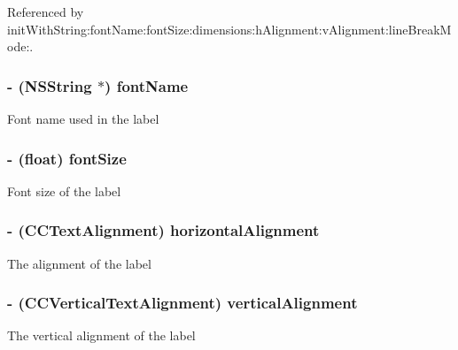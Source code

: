 Referenced by init\-With\-String\-:font\-Name\-:font\-Size\-:dimensions\-:h\-Alignment\-:v\-Alignment\-:line\-Break\-Mode\-:.

\hypertarget{class_c_c_label_t_t_f_a199068e8677eb501ce9c4b450c6bd6d5}{
\subsubsection[{font\-Name}]{\setlength{\rightskip}{0pt plus 5cm}-\/ (N\-S\-String $\ast$) {\bf font\-Name}}}\label{class_c_c_label_t_t_f_a199068e8677eb501ce9c4b450c6bd6d5}
Font name used in the label \hypertarget{class_c_c_label_t_t_f_a1a0e51fec83aae88bb9442d5daf94ceb}{
\subsubsection[{font\-Size}]{\setlength{\rightskip}{0pt plus 5cm}-\/ (float) {\bf font\-Size}}}\label{class_c_c_label_t_t_f_a1a0e51fec83aae88bb9442d5daf94ceb}
Font size of the label \hypertarget{class_c_c_label_t_t_f_a16597bc8f8ede72cadbaf9c3d1aef4f9}{
\subsubsection[{horizontal\-Alignment}]{\setlength{\rightskip}{0pt plus 5cm}-\/ ({\bf C\-C\-Text\-Alignment}) {\bf horizontal\-Alignment}}}\label{class_c_c_label_t_t_f_a16597bc8f8ede72cadbaf9c3d1aef4f9}
The alignment of the label \hypertarget{class_c_c_label_t_t_f_aa57f2a86a130d1f5058f2f45ca89a957}{
\subsubsection[{vertical\-Alignment}]{\setlength{\rightskip}{0pt plus 5cm}-\/ ({\bf C\-C\-Vertical\-Text\-Alignment}) {\bf vertical\-Alignment}}}\label{class_c_c_label_t_t_f_aa57f2a86a130d1f5058f2f45ca89a957}
The vertical alignment of the label 

